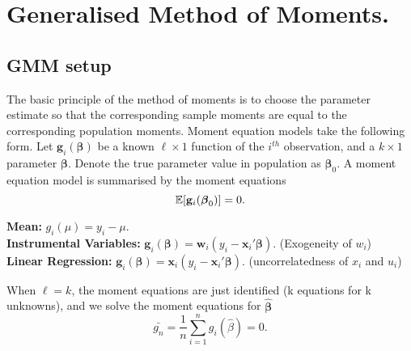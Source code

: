 \documentclass[DIV=14,titlepage=false]{scrreprt}
\begin{document}
\vspace{-10pt}
\setcounter{chapter}{15}

\chapter{Generalised Method of Moments.}
\section{GMM setup}
The basic principle of the method of moments is to choose the parameter estimate so that the corresponding sample moments are equal to the corresponding population moments. Moment equation models take the following form. Let $\mathbf{g}_i(\boldsymbol{\beta})$ be a known $\ell \times1$ function of the $i^{th}$ observation, and a $k\times1$ parameter $\boldsymbol{\beta}$. Denote the true parameter value in population as $\boldsymbol{\beta}_0$. A moment equation model is summarised by the moment equations \[\mathbb{E}[\mathbf{g}_i(\boldsymbol{\beta}_0)]=0.\]
\begin{example}
    \textbf{Mean:} $g_i(\mu)=y_i-\mu$. \\
    \textbf{Instrumental Variables:} $\mathbf{g}_i(\boldsymbol{\beta})=\mathbf{w}_i({y}_i-\mathbf{x}_i'\boldsymbol{\beta})$. (Exogeneity of $w_i$) \\
    \textbf{Linear Regression:} $\mathbf{g}_i(\boldsymbol{\beta})=\mathbf{x}_i({y}_i-\mathbf{x}_i'\boldsymbol{\beta})$. (uncorrelatedness of $x_i$ and $u_i$) 
\end{example}

When $\ell=k$, the moment equations are just identified (k equations for k unknowns), and we solve the moment equations for $\boldsymbol{\hat\beta}$ \[\bar{g_n}=\frac{1}{n}\sum_{i=1}^{n}g_i(\hat \beta)=0.\]
\end{document}
